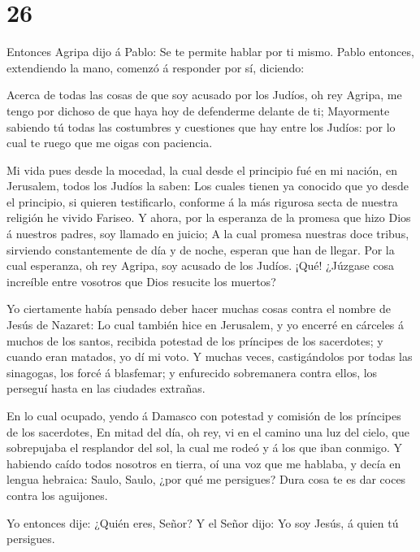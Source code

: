 \hypertarget{section-25}{%
\section{26}\label{section-25}}

 Entonces Agripa dijo á Pablo: Se te permite hablar por ti
mismo. Pablo entonces, extendiendo la mano, comenzó á responder por sí,
diciendo:

 Acerca de todas las cosas de que soy acusado por los
Judíos, oh rey Agripa, me tengo por dichoso de que haya hoy de
defenderme delante de ti;  Mayormente sabiendo tú todas las
costumbres y cuestiones que hay entre los Judíos: por lo cual te ruego
que me oigas con paciencia.

 Mi vida pues desde la mocedad, la cual desde el principio
fué en mi nación, en Jerusalem, todos los Judíos la saben: 
Los cuales tienen ya conocido que yo desde el principio, si quieren
testificarlo, conforme á la más rigurosa secta de nuestra religión he
vivido Fariseo.  Y ahora, por la esperanza de la promesa que
hizo Dios á nuestros padres, soy llamado en juicio;  A la
cual promesa nuestras doce tribus, sirviendo constantemente de día y de
noche, esperan que han de llegar. Por la cual esperanza, oh rey Agripa,
soy acusado de los Judíos.  ¡Qué! ¿Júzgase cosa increíble
entre vosotros que Dios resucite los muertos?

 Yo ciertamente había pensado deber hacer muchas cosas
contra el nombre de Jesús de Nazaret:  Lo cual también hice
en Jerusalem, y yo encerré en cárceles á muchos de los santos, recibida
potestad de los príncipes de los sacerdotes; y cuando eran matados, yo
dí mi voto.  Y muchas veces, castigándolos por todas las
sinagogas, los forcé á blasfemar; y enfurecido sobremanera contra ellos,
los perseguí hasta en las ciudades extrañas.

 En lo cual ocupado, yendo á Damasco con potestad y
comisión de los príncipes de los sacerdotes,  En mitad del
día, oh rey, vi en el camino una luz del cielo, que sobrepujaba el
resplandor del sol, la cual me rodeó y á los que iban conmigo.
 Y habiendo caído todos nosotros en tierra, oí una voz que
me hablaba, y decía en lengua hebraica: Saulo, Saulo, ¿por qué me
persigues? Dura cosa te es dar coces contra los aguijones.

 Yo entonces dije: ¿Quién eres, Señor? Y el Señor dijo: Yo
soy Jesús, á quien tú persigues.

